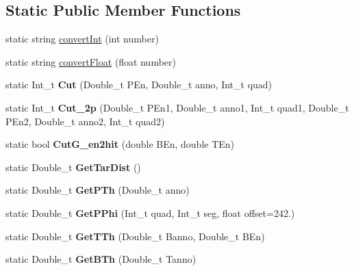 \subsection*{Static Public Member Functions}
\begin{DoxyCompactItemize}
\item 
static string \hyperlink{classdoppler_a100e363bf80b5371baebb89bbf60b824}{convert\+Int} (int number)
\item 
static string \hyperlink{classdoppler_a0fa8eec8989c81e59ecfb8e09140020c}{convert\+Float} (float number)
\item 
\mbox{\label{classdoppler_ae9020810d4d7235eacf2b875c52172f8}} 
static Int\+\_\+t {\bfseries Cut} (Double\+\_\+t P\+En, Double\+\_\+t anno, Int\+\_\+t quad)
\item 
\mbox{\label{classdoppler_add35c6b42292a11a41d4ef055fbf231a}} 
static Int\+\_\+t {\bfseries Cut\+\_\+2p} (Double\+\_\+t P\+En1, Double\+\_\+t anno1, Int\+\_\+t quad1, Double\+\_\+t P\+En2, Double\+\_\+t anno2, Int\+\_\+t quad2)
\item 
\mbox{\label{classdoppler_a39beed8120adbda7dffdeb4e17e986c2}} 
static bool {\bfseries Cut\+G\+\_\+en2hit} (double B\+En, double T\+En)
\item 
\mbox{\label{classdoppler_a3dca88d6ac6d2c411ca26883eb10787a}} 
static Double\+\_\+t {\bfseries Get\+Tar\+Dist} ()
\item 
\mbox{\label{classdoppler_a562426907365a2c4c56fc393264394a4}} 
static Double\+\_\+t {\bfseries Get\+P\+Th} (Double\+\_\+t anno)
\item 
\mbox{\label{classdoppler_ac9cc83b2b22576320980abab50710909}} 
static Double\+\_\+t {\bfseries Get\+P\+Phi} (Int\+\_\+t quad, Int\+\_\+t seg, float offset=242.)
\item 
\mbox{\label{classdoppler_a87a75dbf49952fa574b80e6a991d0286}} 
static Double\+\_\+t {\bfseries Get\+T\+Th} (Double\+\_\+t Banno, Double\+\_\+t B\+En)
\item 
\mbox{\label{classdoppler_a42de1470ae67fefdb3ca1ea1f4d0f326}} 
static Double\+\_\+t {\bfseries Get\+B\+Th} (Double\+\_\+t Tanno)

\end{DoxyCompactItemize}
